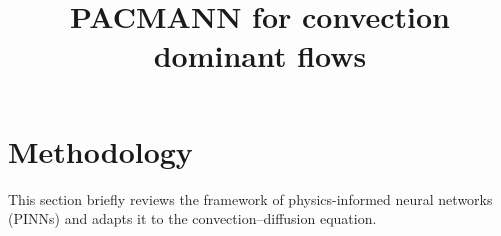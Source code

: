 \documentclass[10pt,reqno]{article}
\date{}
\numberwithin{equation}{section}
\newcommand{\email}[1]{\protect\href{mailto:#1}{#1}}
\begin{document}
\title{PACMANN for convection dominant flows
}

\maketitle







\section{Methodology}
This section briefly reviews the framework of physics-informed neural networks (PINNs) and adapts it to the convection--diffusion equation.
\end{document}
